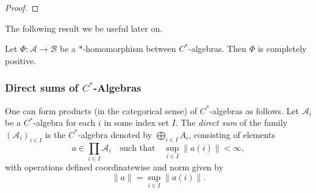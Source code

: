 \begin{proof}
\begin{minipage}{0.45\textwidth}
\centering
{}
\end{minipage}

\end{proof}



The following result we be useful later on.

\begin{proposition} [Proposition 2.3] \cite{choSemanticsQuantumProgramming2016} \label{prop:miu_cp}
  Let $\Phi : \mathscr{A} \to \mathscr{B}$ be a $\ast$-homomorphism between $C^{\ast}$-algebras. Then $\Phi$ is completely positive.
\end{proposition}

\subsubsection{Direct sums of $C^*$-Algebras}

\begin{definition} \label{def:c*_direct_sum}
  One can form products (in the categorical sense) of \( C^* \)-algebras as follows.  
Let \( \mathscr{A}_i \) be a \( C^* \)-algebra for each \( i \) in some index set \( I \).  
The \emph{direct sum} of the family \( (\mathscr{A}_i)_{i \in I} \) is the \( C^* \)-algebra denoted by \( \bigoplus_{i \in I} A_i \), consisting of elements
\[
a \in \prod_{i \in I} \mathscr{A}_i \quad \text{such that} \quad \sup_{i \in I} \|a(i)\| < \infty,
\]
with operations defined coordinatewise and norm given by
\[
\|a\| = \sup_{i \in I} \|a(i)\|.
\]
\end{definition}



